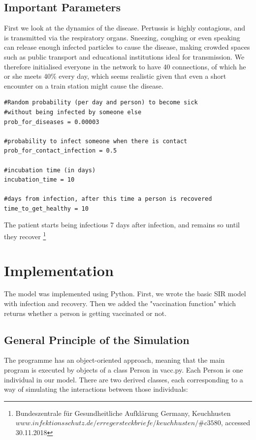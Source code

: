 \documentclass[11pt]{article}
\begin{document}
\subsection{Important Parameters}
First we look at the dynamics of the disease. Pertussis is highly contagious, and is transmitted via the respiratory organs. Sneezing, coughing or even speaking can release enough infected particles to cause the disease, making crowded spaces such as public transport and educational institutions ideal for transmission. We therefore initialised everyone in the network to have 40 connections, of which he or she meets 40\% every day, which seems realistic given that even a short encounter on a train station might cause the disease. 
\begin{lstlisting}
#Random probability (per day and person) to become sick 
#without being infected by someone else
prob_for_diseases = 0.00003 

#probability to infect someone when there is contact
prob_for_contact_infection = 0.5 

#incubation time (in days)
incubation_time = 10
 
#days from infection, after this time a person is recovered
time_to_get_healthy = 10 
\end{lstlisting}

The patient starts being infectious 7 days after infection, and remains so until they recover \footnote{Bundeszentrale für Gesundheitliche Aufklärung Germany, Keuchhusten \break
$www.infektionsschutz.de/erregersteckbriefe/keuchhusten/\#c3580$, accessed 30.11.2018}

\section{Implementation}
The model was implemented using Python. First, we wrote the basic SIR model with infection and recovery. Then we added the "vaccination function" which returns whether a person is getting vaccinated or not. 

\vspace{14px}

\subsection{General Principle of the Simulation}
The programme has an object-oriented approach, meaning that the main program is executed by objects of a class Person in vacc.py. Each Person is one individual in our model. There are two derived classes, each corresponding to a way of simulating the interactions between those individuals:
\vspace{14px}
\end{document}

